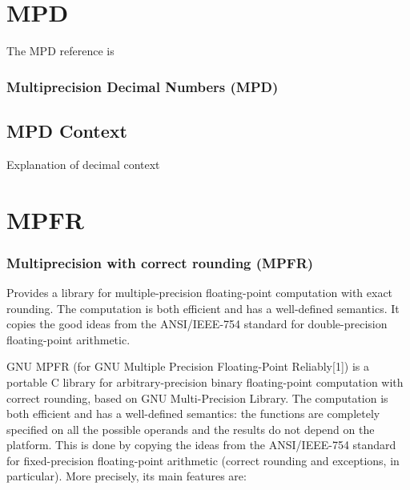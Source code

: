\chapter{MPD}

The MPD reference is \cite{mpd_2012}

\lipsum[1]


\subsection{Multiprecision Decimal Numbers (MPD)}
\lipsum[5]



\section{MPD Context}

Explanation of decimal context

\lipsum[1]



\chapter{MPFR}



\subsection{Multiprecision with correct rounding (MPFR)}
Provides a library for multiple-precision floating-point computation with exact rounding. The computation is both efficient and has a well-defined semantics. It copies the good ideas from the ANSI/IEEE-754 standard for double-precision floating-point arithmetic. 



GNU MPFR (for GNU Multiple Precision Floating-Point Reliably[1]) is a portable C library for arbitrary-precision binary floating-point computation with correct rounding, based on GNU Multi-Precision Library. The computation is both efficient and has a well-defined semantics: the functions are completely specified on all the possible operands and the results do not depend on the platform. This is done by copying the ideas from the ANSI/IEEE-754 standard for fixed-precision floating-point arithmetic (correct rounding and exceptions, in particular). More precisely, its main features are:

